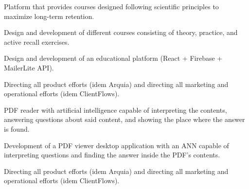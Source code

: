 \documentclass[]{robertino-cv}
\begin{document}
\begin{minipage}[t]{0.50\textwidth}
Platform that provides courses designed following scientific principles to maximize long-term retention.
\begin{tightemize}
\item Design and development of different courses consisting of theory, practice, and active recall exercises.
\item Design and development of an educational platform (React + Firebase + MailerLite API).
\item Directing all product efforts (idem Arquia) and directing all marketing and operational efforts (idem ClientFlows).
\end{tightemize}
\sectionsep


PDF reader with artificial intelligence capable of interpreting the contents, answering questions about said content, and showing the place where the answer is found.
\begin{tightemize}
\item Development of a PDF viewer desktop application with an ANN capable of interpreting questions and finding the answer inside the PDF's contents.
\item Directing all product efforts (idem Arquia) and directing all marketing and operational efforts (idem ClientFlows).
\end{tightemize}
\sectionsep


\end{minipage} 

\noindent\makebox[\linewidth]{\color{headings}\rule{\paperwidth}{0.4pt}}
\end{document}

